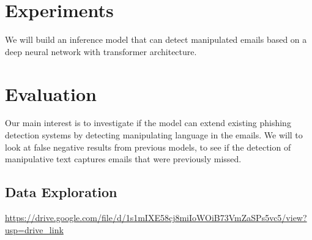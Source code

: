 \documentclass[
	letterpaper, %
	12pt, %
	unnumberedsections, %
	twoside, %
]{LTJournalArticle}
\begin{document}
\section{Experiments}
We will build an inference model that can detect manipulated emails based on a deep neural network with transformer architecture.

\section{Evaluation}
Our main interest is to investigate if the model can extend existing phishing detection systems by detecting manipulating language in the emails. We will to look at false negative results from previous models, to see if the detection of manipulative text captures emails that were previously missed.








\clearpage
\onecolumn
\printbibliography %



\begin{appendices}
	\onecolumn
	\section{Data Exploration}\label{appendix:DataExploration}
	\url{https://drive.google.com/file/d/1s1mIXE58cj8miIoWOiB73VmZaSPs5vc5/view?usp=drive_link}
\end{appendices}
%
\end{document}
